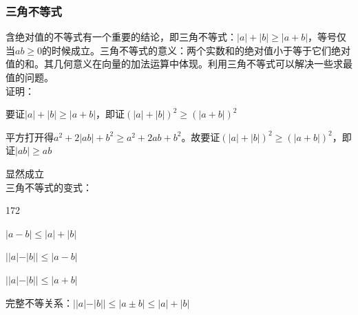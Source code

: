 \subsubsection*{三角不等式}
含绝对值的不等式有一个重要的结论，即三角不等式：$|a| + |b| \geq |a+b|$，等号仅当$ab \geq 0$的时候成立。三角不等式的意义：两个实数和的绝对值小于等于它们绝对值的和。其几何意义在向量的加法运算中体现。利用三角不等式可以解决一些求最值的问题。\\
证明：\\
\par 要证$|a| + |b| \geq |a+b|$，即证$(|a| + |b|)^2 \geq (|a+b|)^2$ \\
\par 平方打开得$a^2 + 2|ab| + b^2 \geq a^2 + 2ab + b^2$。故要证$(|a| + |b|)^2 \geq (|a+b|)^2$，即证$|ab| \geq ab$ \\
\par 显然成立\\
三角不等式的变式：
\begin{dingautolist}{172}
    \item $|a-b| \leq |a| + |b|$
    \item $||a| - |b|| \leq |a-b|$
    \item $||a| - |b|| \leq |a+b|$
\end{dingautolist}
完整不等关系：$||a| - |b|| \leq |a \pm b| \leq |a| + |b|$ \\

